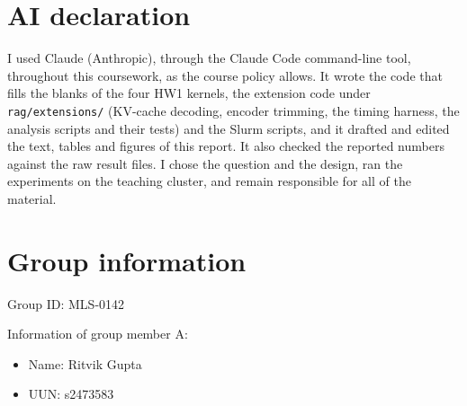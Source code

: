 \documentclass{article}
\begin{document}
\section*{AI declaration}
I used Claude (Anthropic), through the Claude Code command-line tool, throughout this
coursework, as the course policy allows. It wrote the code that fills the blanks of the
four HW1 kernels, the extension code under \texttt{rag/extensions/} (KV-cache decoding,
encoder trimming, the timing harness, the analysis scripts and their tests) and the
Slurm scripts, and it drafted and edited the text, tables and figures of this report.
It also checked the reported numbers against the raw result files. I chose the
question and the design, ran the experiments on the teaching cluster, and remain
responsible for all of the material.

\section*{Group information}
Group ID: MLS-0142

Information of group member A:
\begin{itemize}
    \item Name: Ritvik Gupta
    \item UUN: s2473583
\end{itemize}
\end{document}
